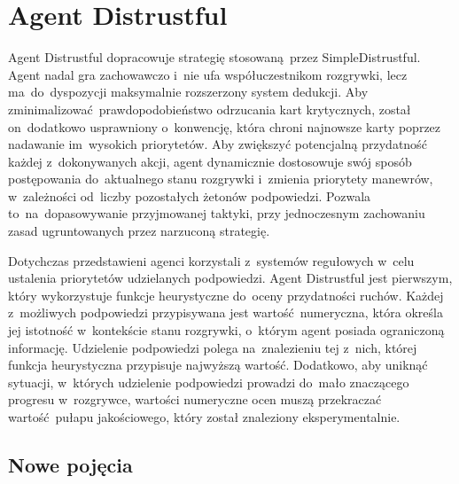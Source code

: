 \documentclass[declaration,shortabstract,inz]{iithesis}
\begin{document}
\section{Agent Distrustful}

Agent Distrustful dopracowuje strategię stosowaną przez SimpleDistrustful. Agent nadal gra zachowawczo i~nie ufa współuczestnikom rozgrywki, lecz ma~do~dyspozycji maksymalnie rozszerzony system dedukcji. Aby zminimalizować prawdopodobieństwo odrzucania kart krytycznych, został on~dodatkowo usprawniony o~konwencję, która chroni najnowsze karty poprzez nadawanie im~wysokich priorytetów. Aby zwiększyć potencjalną przydatność każdej z~dokonywanych akcji, agent dynamicznie dostosowuje swój sposób postępowania do~aktualnego stanu rozgrywki i~zmienia priorytety manewrów, w~zależności od~liczby pozostałych żetonów podpowiedzi. Pozwala to~na~dopasowywanie przyjmowanej taktyki, przy jednoczesnym zachowaniu zasad ugruntowanych przez narzuconą strategię.

Dotychczas przedstawieni agenci korzystali z~systemów regułowych w~celu ustalenia priorytetów udzielanych podpowiedzi. Agent Distrustful jest pierwszym, który wykorzystuje funkcje heurystyczne do~oceny przydatności ruchów. Każdej z~możliwych podpowiedzi przypisywana jest wartość numeryczna, która określa jej istotność w~kontekście stanu rozgrywki, o~którym agent posiada ograniczoną informację. Udzielenie podpowiedzi polega na~znalezieniu tej z~nich, której funkcja heurystyczna przypisuje najwyższą wartość. Dodatkowo, aby uniknąć sytuacji, w~których udzielenie podpowiedzi prowadzi do~mało znaczącego progresu w~rozgrywce, wartości numeryczne ocen muszą przekraczać wartość pułapu jakościowego, który został znaleziony eksperymentalnie.

\subsection*{Nowe pojęcia}
\end{document}
